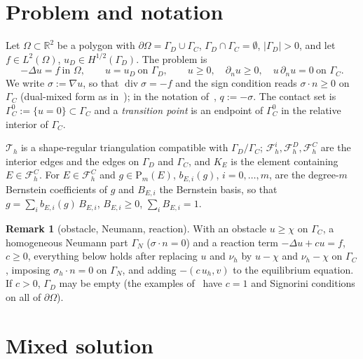 \documentclass[11pt,a4paper]{article}
\theoremstyle{definition}
\newtheorem{remark}[definition]{Remark}
\newcommand{\Pk}[1]{\mathrm{P}_{#1}}
\newcommand{\dive}{\operatorname{div}}
\newcommand{\Th}{\mathcal{T}_h}
\newcommand{\Fi}{\mathcal{F}^{i}_h}
\newcommand{\FD}{\mathcal{F}^{D}_h}
\newcommand{\FC}{\mathcal{F}^{C}_h}
\begin{document}
\section{Problem and notation}

Let $\Omega\subset\mathbb{R}^2$ be a polygon with $\partial\Omega=\Gamma_D\cup\Gamma_C$,
$\Gamma_D\cap\Gamma_C=\emptyset$, $|\Gamma_D|>0$, and let $f\in L^2(\Omega)$, $u_D\in
H^{1/2}(\Gamma_D)$. The problem is
\begin{equation}\label{eq:problem}
  -\Delta u=f \ \text{in }\Omega,\qquad u=u_D \ \text{on }\Gamma_D,\qquad
  u\ge0,\quad \partial_nu\ge0,\quad u\,\partial_nu=0 \ \text{on }\Gamma_C .
\end{equation}
We write $\sigma:=\nabla u$, so that $\dive\sigma=-f$ and the sign condition reads
$\sigma\cdot n\ge0$ on $\Gamma_C$ (dual-mixed form as in~\cite{wang}); in the notation
of~\cite{mrv}, $q:=-\sigma$. The contact set is
$\Gamma_C^0:=\{u=0\}\subset\Gamma_C$ and a \emph{transition point} is an endpoint of
$\Gamma_C^0$ in the relative interior of $\Gamma_C$.

$\Th$ is a shape-regular triangulation compatible with $\Gamma_D/\Gamma_C$; $\Fi,\FD,\FC$ are the
interior edges and the edges on $\Gamma_D$ and $\Gamma_C$, and $K_E$ is the element containing
$E\in\FC$. For $E\in\FC$ and $g\in\Pk{m}(E)$, $b_{E,i}(g)$, $i=0,\dots,m$, are the degree-$m$
Bernstein coefficients of $g$ and $B_{E,i}$ the Bernstein basis, so that
$g=\sum_ib_{E,i}(g)\,B_{E,i}$, $B_{E,i}\ge0$, $\sum_iB_{E,i}=1$.

\begin{remark}[obstacle, Neumann, reaction]\label{rem:variants}
With an obstacle $u\ge\chi$ on $\Gamma_C$, a homogeneous Neumann part $\Gamma_N$
($\sigma\cdot n=0$) and a reaction term $-\Delta u+cu=f$, $c\ge0$, everything below holds after
replacing $u$ and $\nu_h$ by $u-\chi$ and $\nu_h-\chi$ on $\Gamma_C$, imposing $\sigma_h\cdot n=0$
on $\Gamma_N$, and adding $-(c\,u_h,v)$ to the equilibrium equation. If $c>0$, $\Gamma_D$ may be
empty (the examples of~\cite{fhs} have $c=1$ and Signorini conditions on all of $\partial\Omega$).
\end{remark}

\section{Mixed solution}
\end{document}
